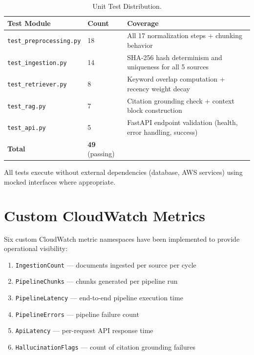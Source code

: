 \documentclass[12pt,a4paper]{report}
\begin{document}
\begin{table}[H]
\caption{Unit Test Distribution.}
\label{tab:tests}
\centering
\begin{tabular}{p{4.5cm}p{1.5cm}p{6.5cm}}
\toprule
\textbf{Test Module} & \textbf{Count} & \textbf{Coverage} \\
\midrule
\texttt{test\_preprocessing.py} & 18 & All 17 normalization steps + chunking behavior \\
\texttt{test\_ingestion.py} & 14 & SHA-256 hash determinism and uniqueness for all 5 sources \\
\texttt{test\_retriever.py} & 8 & Keyword overlap computation + recency weight decay \\
\texttt{test\_rag.py} & 7 & Citation grounding check + context block construction \\
\texttt{test\_api.py} & 5 & FastAPI endpoint validation (health, error handling, success) \\
\midrule
\textbf{Total} & \textbf{49} (passing) & \\
\bottomrule
\end{tabular}
\end{table}

All tests execute without external dependencies (database, AWS services) using mocked interfaces where appropriate.

\section{Custom CloudWatch Metrics}
\label{sec:metrics}

Six custom CloudWatch metric namespaces have been implemented to provide operational visibility:

\begin{enumerate}[leftmargin=0.5in]
  \item \texttt{IngestionCount} --- documents ingested per source per cycle
  \item \texttt{PipelineChunks} --- chunks generated per pipeline run
  \item \texttt{PipelineLatency} --- end-to-end pipeline execution time
  \item \texttt{PipelineErrors} --- pipeline failure count
  \item \texttt{ApiLatency} --- per-request API response time
  \item \texttt{HallucinationFlags} --- count of citation grounding failures
\end{enumerate}
\end{document}
